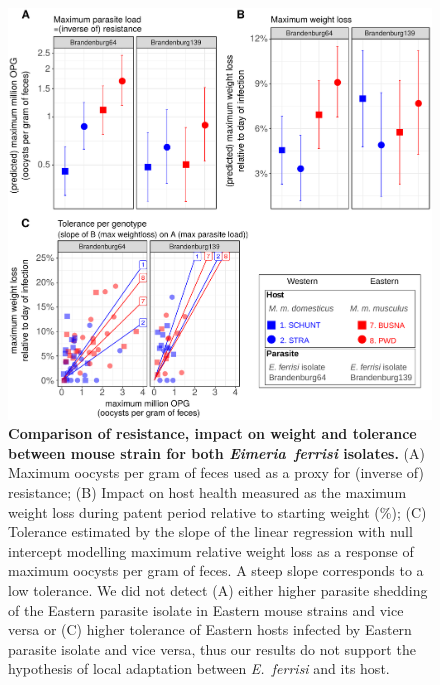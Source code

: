\documentclass[12pt]{article}
\begin{document}
\begin{figure}[H]
    \centering
    \includegraphics[width=\linewidth,height=\textheight,keepaspectratio]{images/Fig3_final.pdf}
    \caption{\textbf{Comparison of resistance, impact on weight and tolerance between mouse strain for both \textit{Eimeria~ferrisi} isolates.} (A) Maximum oocysts per gram of feces used as a proxy for (inverse of) resistance; (B) Impact on host health measured as the maximum weight loss during patent period relative to starting weight (\%); (C) Tolerance estimated by the slope of the linear regression with null intercept modelling maximum relative weight loss as a response of maximum oocysts per gram of feces. A steep slope corresponds to a low tolerance. We did not detect (A) either higher parasite shedding of the Eastern parasite isolate in Eastern mouse strains and vice versa or (C) higher tolerance of Eastern hosts infected by Eastern parasite isolate and vice versa, thus our results do not support the hypothesis of local adaptation between \textit{E.~ferrisi} and its host.}
\end{figure}
\end{document}
